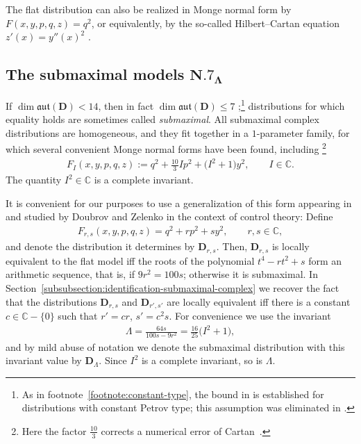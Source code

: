 \documentclass[pdftex]{sigma}
\newcommand{\bbC}{\mathbb{C}}
\newcommand{\mbD}{\mathbf{D}}
\newcommand{\mfaut}{\mathfrak{aut}}
\numberwithin{equation}{section}
\begin{document}
The flat distribution can also be realized in Monge normal form by $F(x, y, p, q, z) = q^2$, or equivalently, by the so-called Hilbert--Cartan equation $z'(x) = y''(x)^2$ \cite{CartanCurves, Hilbert}.

\subsection[The submaximal models $\mathbf{N.7}_\Lambda$]{The submaximal models $\boldsymbol{\mathbf{N.7}_\Lambda}$}\label{subsection:N.7}
If $\dim \mfaut(\mbD) < 14$, then in fact $\dim \mfaut(\mbD) \leq 7$ \cite{CartanFiveVariables, KruglikovThe};\footnote{As in footnote~\ref{footnote:constant-type}, the bound in \cite{CartanFiveVariables} is established for distributions with constant Petrov type; this assumption was eliminated in \cite{KruglikovThe}.} distributions for which equality holds are sometimes called \textit{submaximal}. All submaximal complex distributions are homogeneous, and they fit together in a $1$-parameter family, for which several convenient Monge normal forms have been found, including \cite[Section~45]{CartanFiveVariables}\footnote{Here the factor $\frac{10}{3}$ corrects a numerical error of Cartan~\cite{Strazzullo}.}
\begin{gather*}
	F_I(x, y, p, q, z) := q^2 + \tfrac{10}{3} I p^2 + \big(I^2 + 1\big) y^2 , \qquad I \in \bbC .
\end{gather*}
The quantity $I^2 \in \bbC$ is a complete invariant.

It is convenient for our purposes to use a generalization of this form appearing in \cite[Section~4]{CartanFiveVariables} and studied by Doubrov and Zelenko in the context of control theory: Define \cite{DoubrovZelenko}
\begin{gather*}
	F_{r, s}(x, y, p, q, z) = q^2 + r p^2 + s y^2, \qquad r, s \in \bbC ,
\end{gather*}
and denote the distribution it determines by $\mbD_{r, s}$. Then, $\mbD_{r, s}$ is locally equivalent to the flat model iff the roots of the polynomial $t^4 - r t^2 + s$ form an arithmetic sequence, that is, if $9 r^2 = 100 s$; otherwise it is submaximal. In Section~\ref{subsubsection:identification-submaximal-complex} we recover the fact that the distributions $\mbD_{r, s}$ and $\mbD_{r', s'}$ are locally equivalent iff there is a constant $c \in \bbC - \{ 0 \}$ such that $r' = c r$, $s' = c^2 s$. For convenience we use the invariant
\begin{gather*}
 \Lambda = \frac{64 s}{100 s - 9 r^2} = \frac{16}{25} \big(I^2 + 1\big) ,
\end{gather*}
and by mild abuse of notation we denote the submaximal distribution with this invariant value by $\mbD_\Lambda$. Since $I^2$ is a complete invariant, so is $\Lambda$.
\end{document}
